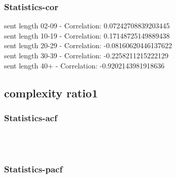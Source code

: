 \documentclass{article}%
\begin{document}
%
\newpage%
\subsubsection{Statistics{-}cor}%
\label{ssubsec:Statistics{-}cor}%
\noindent%
sent length 02-09 - Correlation: 0.07242708839203445\\%
sent length 10-19 - Correlation: 0.17148725149889438\\%
sent length 20-29 - Correlation: -0.08160620446137622\\%
sent length 30-39 - Correlation: -0.2258211215222129\\%
sent length 40+ - Correlation: -0.9202143981918636\\

%
\newpage

%
\subsection{complexity ratio1}%
\label{subsec:complexityratio1}%
\subsubsection{Statistics{-}acf}%
\label{ssubsec:Statistics{-}acf}%


\begin{figure}[ht]%
\centering%
\setlength{\abovecaptionskip}{-35pt}%
%
%
\\%
%
%
\\%
%
\end{figure}

%
\newpage%
\subsubsection{Statistics{-}pacf}%
\label{ssubsec:Statistics{-}pacf}%
\end{document}
